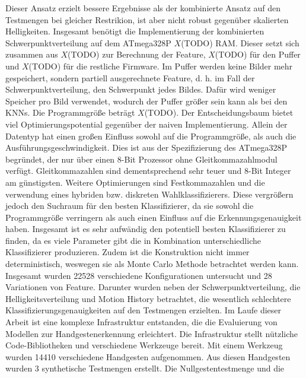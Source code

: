 Dieser Ansatz erzielt bessere Ergebnisse als der kombinierte Ansatz auf den Testmengen bei gleicher Restrikion, ist aber nicht robust gegenüber skalierten Helligkeiten.
\newline
\newline
Insgesamt benötigt die Implementierung der kombinierten Schwerpunktverteilung auf dem ATmega328P $X$(TODO) RAM. Dieser setzt sich zusammen aus $X$(TODO) zur Berechnung der Feature, $X$(TODO) für den Puffer und
$X$(TODO) für die restliche Firmware. Im Puffer werden keine Bilder mehr gespeichert, sondern partiell ausgerechnete Feature, d. h. im Fall der Schwerpunktverteilung, den Schwerpunkt jedes Bildes.
Dafür wird weniger Speicher pro Bild verwendet, wodurch der Puffer größer sein kann als bei den KNNs. Die Programmgröße beträgt $X$(TODO).
\newline
\newline
Der Entscheidungsbaum bietet viel Optimierungspotential gegenüber der naiven Implementierung. Allein der Datentyp hat einen großen Einfluss sowohl auf die Programmgröße, als auch die Ausführungsgeschwindigkeit.
Dies ist aus der Spezifizierung des ATmega328P begründet, der nur über einen 8-Bit Prozessor ohne Gleitkommazahlmodul verfügt. Gleitkommazahlen sind dementsprechend sehr teuer und 8-Bit Integer am günstigsten.
Weitere Optimierungen sind Festkommazahlen und die verwendung eines hybriden bzw. diskreten Wahlklassifizierers. Diese vergrößern jedoch den Suchraum für den besten Klassifizierer, da sie sowohl die
Programmgröße verringern als auch einen Einfluss auf die Erkennungsgenauigkeit haben.
\newline
\newline
Insgesamt ist es sehr aufwändig den potentiell besten Klassifizierer zu finden, da es viele Parameter gibt die in Kombination unterschiedliche Klassifizierer produzieren. Zudem ist die
Konstruktion nicht immer deterministisch, weswegen sie als Monte Carlo Methode betrachtet werden kann. Insgesamt wurden 22528 verschiedene Konfigurationen untersucht und 28 Variationen von Feature.
Darunter wurden neben der Schwerpunktverteilung, die Helligkeitsverteilung und Motion History betrachtet, die wesentlich schlechtere Klassifizierungsgenauigkeiten auf den Testmengen erzielten.
\newline
\newline
Im Laufe dieser Arbeit ist eine komplexe Infrastruktur entstanden, die die Evaluierung von Modellen zur Handgestenerkennung erleichtert. Die Infrastruktur stellt nützliche Code-Bibliotheken und verschiedene
Werkzeuge bereit. Mit einem Werkzeug wurden 14410 verschiedene Handgesten aufgenommen. Aus diesen Handgesten wurden 3 synthetische Testmengen erstellt. Die Nullgestentestmenge und die
